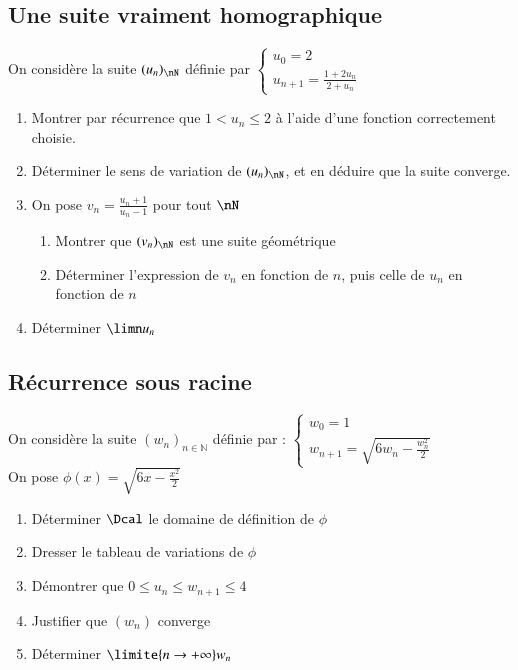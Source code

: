 \documentclass[oneside,12pt]{article}          %
\begin{document}
\subsection{Une suite vraiment homographique}
On considère la suite $(u_n)_{\nN}$ définie par $\begin{cases}u_0=2\\u_{n+1}=\frac{1+2u_n}{2+u_n}\end{cases}$ 
\begin{enumerate}
    \item Montrer par récurrence que $1<u_n\leq2$ à l'aide d'une fonction correctement choisie.
    \item Déterminer le sens de variation de $(u_n)_{\nN}$, et en déduire que la suite converge.
    \item On pose $v_n=\frac{u_n+1}{u_n-1}$ pour tout $\nN$
    \begin{enumerate}
        \item Montrer que $(v_n)_{\nN}$ est une suite géométrique
        \item Déterminer l'expression de $v_n$ en fonction de $n$, puis celle de $u_n$ en fonction de $n$
    \end{enumerate}
    \item Déterminer $\limn u_n$
\end{enumerate}



\subsection{Récurrence sous racine}
On considère la suite $(w_n)_{n \in \mathbb{N}}$ définie par : $\begin{cases}w_0 = 1\\w_{n+1}=\sqrt{6 w_n - \frac{w_n^2}{2}}\end{cases}$\\
On pose $\phi(x) = \sqrt{6x - \frac{x^2}{2}}$
\begin{enumerate}
    \item Déterminer $\Dcal$ le domaine de définition de $\phi$
    \item Dresser le tableau de variations de $\phi$
    \item Démontrer que $0 \leq u_n \leq w_{n+1} \leq 4$
    \item Justifier que $(w_n)$ converge
    \item Déterminer $\limite{n \to +\infty} w_n$
\end{enumerate}
\end{document}
